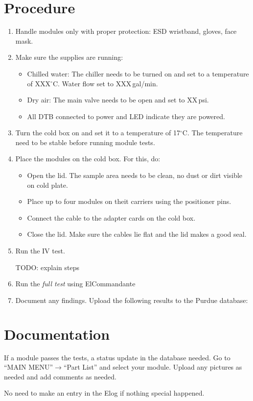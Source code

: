 \documentclass[12pt]{unlsilabsop}
\begin{document}
\section{Procedure}

\begin{enumerate}
    \item Handle modules only with proper protection: ESD wristband, gloves, face mask.
    \item Make sure the supplies are running:
    \begin{itemize}
        \item Chilled water: The chiller needs to be turned on and set to a temperature of XXX$^\circ$C. Water flow set to XXX\,gal/min.
        \item Dry air: The main valve needs to be open and set to XX\,psi.
        \item All DTB connected to power and LED indicate they are powered.
    \end{itemize}
    \item Turn the cold box on and set it to a temperature of 17$^\circ$C. The temperature need to be stable before running module tests.
    \item Place the modules on the cold box. For this, do:
    \begin{itemize}
        \item Open the lid. The sample area needs to be clean, no dust or dirt visible on cold plate.
        \item Place up to four modules on theit carriers using the positioner pins.
        \item Connect the cable to the adapter cards on the cold box.
        \item Close the lid. Make sure the cables lie flat and the lid makes a good seal.
    \end{itemize}
    \item Run the IV test.

        TODO: explain steps
    \item Run the \emph{full test} using ElCommandante
    \item Document any findings. Upload the following results to the Purdue database:
\end{enumerate}

\section{Documentation}
If a module passes the tests, a status update in the database needed. Go to ``MAIN MENU''$\rightarrow$``Part List'' and select your module. Upload any pictures as needed and add comments as needed.

No need to make an entry in the Elog if nothing special happened.
\end{document}
